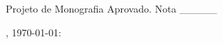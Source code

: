 \begin{folhadeaprovacao}

	\begin{center}
		
		{\ABNTEXchapterfont\large\imprimirautor}

		\vspace*{\fill}\vspace*{\fill}
		\begin{center}
		\ABNTEXchapterfont\bfseries\Large\imprimirtitulo
		\end{center}
		\vspace*{\fill}

		\hspace{.45\textwidth}
		\begin{minipage}{.5\textwidth}
		\imprimirpreambulo
		\end{minipage}%
		\vspace*{\fill}

        \end{center}

                Projeto de Monografia Aprovado. Nota \_\_\_\_\_

                \imprimirlocal, \today:



	\begin{center}

		\vspace*{0.5cm}
		{\large\imprimirlocal}
		\par
		{\large\imprimirdata}
		\vspace*{1cm}

	\end{center}

\end{folhadeaprovacao}
